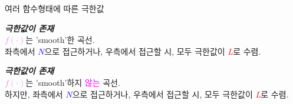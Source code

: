 \documentclass[aspectratio=169]{beamer}
\begin{document}
\begin{frame}{여러 함수형태에 따른 극한값}

  \begin{minipage}[t]{0.48\textwidth}
    \footnotesize
    \textbf{\emph{극한값이 존재}}\\
    \small \textcolor{violet}{$f(\cdot)$}는 'smooth'한 곡선.\\
    좌측에서 \textcolor{blue}{$N$}으로 접근하거나, 우측에서 접근할 시, 모두 극한값이 \textcolor{red}{\emph{L}}로 수렴.
  \end{minipage}
  \hfill
  \begin{minipage}[t]{0.48\textwidth}
    \footnotesize
    \textbf{\emph{극한값이 존재}}\\
    \small \textcolor{violet}{$f(\cdot)$}는 'smooth'하지 \textcolor{magenta}{않는} 곡선.\\
    하지만, 좌측에서 \textcolor{blue}{$N$}으로 접근하거나, 우측에서 접근할 시, 모두 극한값이 \textcolor{red}{\emph{L}}로 수렴.
  \end{minipage}
\end{frame}
\end{document}

